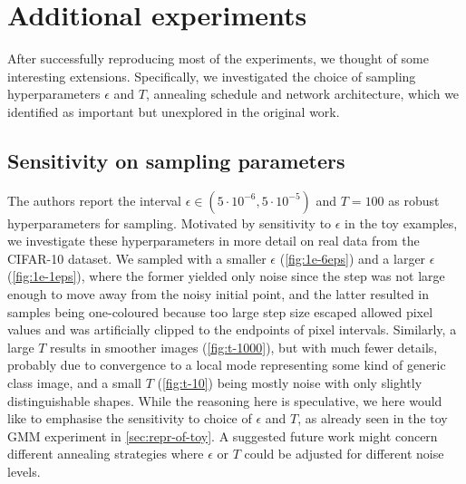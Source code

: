 \section{Additional experiments}
\label{sec:additional}
After successfully reproducing most of the experiments, we thought of some interesting extensions. Specifically, we investigated the choice of sampling hyperparameters $\epsilon$ and $T$, annealing schedule and network architecture, which we identified as important but unexplored in the original work. \vspace{-0.9mm}

\subsection{Sensitivity on sampling parameters}
The authors report the interval $\epsilon \in (5\cdot 10^{-6}, 5\cdot 10^{-5})$ and $T = 100$ as robust hyperparameters for sampling. Motivated by sensitivity to $\epsilon$ in the toy examples, we investigate these hyperparameters in more detail on real data from the CIFAR-10 dataset. We sampled with a smaller $\epsilon$ (\autoref{fig:1e-6eps}) and a larger $\epsilon$ (\autoref{fig:1e-1eps}), where the former yielded only noise since the step was not large enough to move away from the noisy initial point, and the latter resulted in samples being one-coloured because too large step size escaped allowed pixel values and was artificially clipped to the endpoints of pixel intervals. Similarly, a large $T$ results in smoother images (\autoref{fig:t-1000}), but with much fewer details, probably due to convergence to a local mode representing some kind of generic class image, and a small $T$ (\autoref{fig:t-10}) being mostly noise with only slightly distinguishable shapes. While the reasoning here is speculative, we here would like to emphasise the sensitivity to choice of $\epsilon$ and $T$, as already seen in the toy GMM experiment in \autoref{sec:repr-of-toy}. A suggested future work might concern different annealing strategies where $\epsilon$ or $T$ could be adjusted for different noise levels.\vspace{-2mm}

